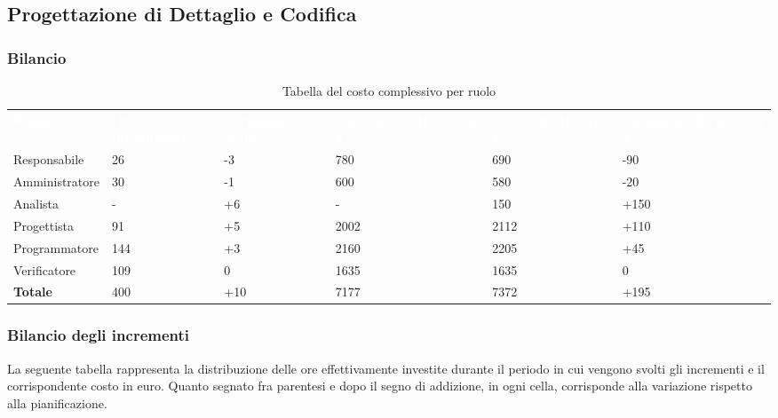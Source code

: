 \subsection{Progettazione di Dettaglio e Codifica}
\subsubsection{Bilancio}

{
\renewcommand{\arraystretch}{2}
\begin{longtable}[h]{ C{2.5cm} C{2.5cm} C{2.5cm} C{2.5cm} C{1.5cm} C{2.5cm}}
\caption{Tabella del costo complessivo per ruolo}\\

\textcolor{white}{\textbf{Ruolo}} & 
\textcolor{white}{\textbf{Ore preventivate}} & 
\textcolor{white}{\textbf{Variazione oraria}} & 
\textcolor{white}{\textbf{Costo preventivato (in \euro{})}} & 
\textcolor{white}{\textbf{Costo effettivo (in \euro{})}} & 
\textcolor{white}{\textbf{Variazione di costo (in \euro{})}}\\	
	
Responsabile    &  26 &  -3 &  780 &  690 &  -90 \\
Amministratore  &  30 &  -1 &  600 &  580 &  -20 \\
Analista        &   - &  +6 &    - &  150 & +150 \\
Progettista     &  91 &  +5 & 2002 & 2112 & +110 \\
Programmatore   & 144 &  +3 & 2160 & 2205 &  +45 \\
Verificatore    & 109 &   0 & 1635 & 1635 &    0 \\
\textbf{Totale} & 400 & +10 & 7177 & 7372 & +195 \\	

\end{longtable}
}

\subsubsection{Bilancio degli incrementi}
La seguente tabella rappresenta la distribuzione delle ore effettivamente investite durante il periodo in cui vengono svolti gli incrementi e il corrispondente costo in euro.
Quanto segnato fra parentesi e dopo il segno di addizione, in ogni cella, corrisponde alla variazione rispetto alla pianificazione.

